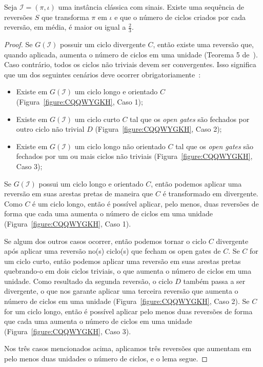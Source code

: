 \begin{lemma}\label{lemma:ZUHMXSRH}
Seja $\mathcal{I}=(\pi,\iota)$ uma instância clássica com sinais. Existe uma sequência de reversões $S$ que transforma $\pi$ em $\iota$ e que o número de ciclos criados por cada reversão, em média, é maior ou igual a $\frac{2}{3}$.
\end{lemma}
\begin{proof}
Se $G(\mathcal{I})$ possuir um ciclo divergente $C$, então existe uma reversão que, quando aplicada, aumenta o número de ciclos em uma unidade (Teorema 5 de~\cite{1998-walter-etal}). Caso contrário, todos os ciclos não triviais devem ser convergentes. Isso significa que um dos seguintes cenários deve ocorrer obrigatoriamente~\cite{2019a-oliveira-etal}:
\begin{itemize}
  \item Existe em $G(\mathcal{I})$ um ciclo longo e orientado $C$ (Figura~\ref{figure:CQQWYGKH}, Caso 1);
  \item Existe em $G(\mathcal{I})$ um ciclo curto $C$ tal que os \emph{open gates} são fechados por outro ciclo não trivial $D$ (Figura~\ref{figure:CQQWYGKH}, Caso 2);
  \item Existe em $G(\mathcal{I})$ um ciclo longo não orientado $C$ tal que os \emph{open gates} são fechados por um ou mais ciclos não triviais (Figura~\ref{figure:CQQWYGKH}, Caso 3);
\end{itemize}

Se $G(\mathcal{I})$ possui um ciclo longo e orientado $C$, então podemos aplicar uma reversão em suas arestas pretas de maneira que $C$ é transformado em divergente. Como $C$ é um ciclo longo, então é possível aplicar, pelo menos, duas reversões de forma que cada uma aumenta o número de ciclos em uma unidade (Figura~\ref{figure:CQQWYGKH}, Caso 1).

Se algum dos outros casos ocorrer, então podemos tornar o ciclo $C$ divergente após aplicar uma reversão no(s) ciclo(s) que fecham os open gates de $C$. Se $C$ for um ciclo curto, então podemos aplicar uma reversão em suas arestas pretas quebrando-o em dois ciclos triviais, o que aumenta o número de ciclos em uma unidade. Como resultado da segunda reversão, o ciclo $D$ também passa a ser divergente, o que nos garante aplicar uma terceira reversão que aumenta o número de ciclos em uma unidade (Figura~\ref{figure:CQQWYGKH}, Caso 2). Se $C$ for um ciclo longo, então é possível aplicar pelo menos duas reversões de forma que cada uma aumenta o número de ciclos em uma unidade (Figura~\ref{figure:CQQWYGKH}, Caso 3).

Nos três casos mencionados acima, aplicamos três reversões que aumentam em pelo menos duas unidades o número de ciclos, e o lema segue.
\end{proof}

